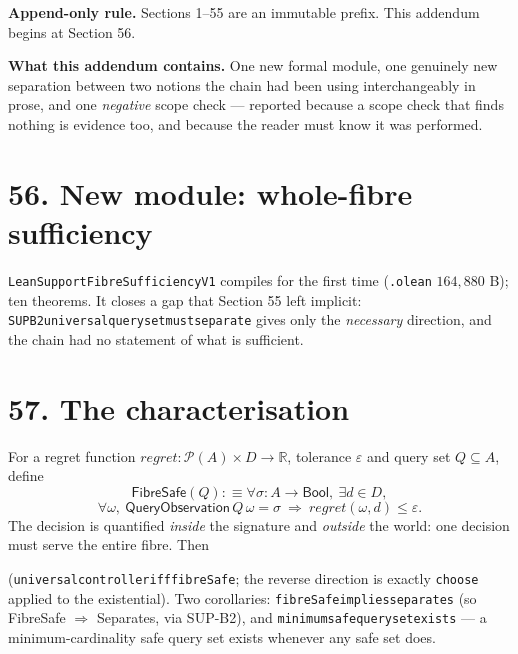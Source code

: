 \documentclass[9pt,twocolumn]{article}
\renewcommand{\_}{\CIGunderscore\allowbreak}
\begin{document}
\sloppy
{}

\textbf{Append-only rule.} Sections 1--55 are an immutable prefix. This addendum begins at Section 56.

\textbf{What this addendum contains.} One new formal module, one genuinely new separation between two notions the chain had been using interchangeably in prose, and one \emph{negative} scope check --- reported because a scope check that finds nothing is evidence too, and because the reader must know it was performed.

\section*{56. New module: whole-fibre sufficiency}
\texttt{LeanSupportFibreSufficiencyV1} compiles for the first time (\texttt{.olean} $164{,}880$ B); ten theorems. It closes a gap that Section 55 left implicit: \texttt{SUP\_B2\_universal\_query\_set\_must\_separate} gives only the \emph{necessary} direction, and the chain had no statement of what is sufficient.

\section*{57. The characterisation}
For a regret function $\textit{regret}:\mathcal{P}(A)\times D\to\mathbb{R}$, tolerance $\varepsilon$ and query set $Q\subseteq A$, define
\[\textsf{FibreSafe}(Q):\equiv\forall \sigma\!:\!A\!\to\!\textsf{Bool},\ \exists d\in D,\]
\[\forall\omega,\ \textsf{QueryObservation}\,Q\,\omega=\sigma\ \Rightarrow\ \textit{regret}(\omega,d)\le\varepsilon .\]
The decision is quantified \emph{inside} the signature and \emph{outside} the world: one decision must serve the entire fibre. Then
\begin{center}\end{center}
(\texttt{universal\_controller\_iff\_fibreSafe}; the reverse direction is exactly \texttt{choose} applied to the existential). Two corollaries: \texttt{fibreSafe\_implies\_separates} (so \textsf{FibreSafe} $\Rightarrow$ \textsf{Separates}, via SUP-B2), and \texttt{minimum\_safe\_query\_set\_exists} --- a minimum-cardinality safe query set exists whenever any safe set does.
\end{document}
